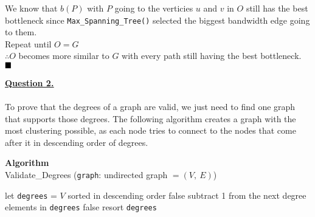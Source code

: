 \documentclass[12pt]{article}
\begin{document}
\begin{adjustwidth}{10mm}{}
	We know that $b(P)$ with $P$ going to the verticies $u$ and $v$ in $O$ still has the best bottleneck since \texttt{Max\_Spanning\_Tree()}
	selected the biggest bandwidth edge going to them.\\

	Repeat until $O = G$\\
	$\therefore O$ becomes more similar to $G$ with every path still having the best bottleneck. $\hspace*{\fill}\blacksquare$

\end{adjustwidth}
\newpage
\hyperlink{toc}{\hypertarget{2}{\LARGE \underline{\textbf{Question 2.}}}}\\\\
To prove that the degrees of a graph are valid, we just need to find one graph that supports those degrees.
The following algorithm creates a graph with the most clustering possible,
as each node tries to connect to the nodes that come after it in descending order of degrees.\\

\begin{algorithm}
	\caption*{\textbf{Algorithm}\\Validate\_Degrees \big(\texttt{graph}: undirected graph $= (V,\ E)$\big)}\label{alg:cap}
	\begin{algorithmic}[1]
		\State let \texttt{degrees} = $V$ sorted in descending order
			\State \Return false
		\EndIf
		\State
		\State subtract 1 from the next degree elements in \texttt{degrees}
			\State \Return false
		\EndIf
		\State resort \texttt{degrees}
		\EndFor
		\State
		\State{}
	\end{algorithmic}
\end{algorithm}
\end{document}
